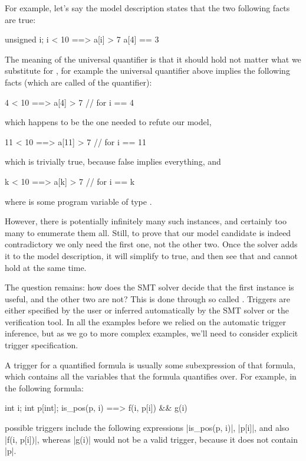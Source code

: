 For example, let's say the model description states that the two
following facts are true:
\begin{VCC}
\forall unsigned i; i < 10 ==> a[i] > 7
a[4] == 3
\end{VCC}
The meaning of the universal quantifier is that it should hold
not matter what we substitute for , for example
the universal quantifier above implies the following facts (which
are called  of the quantifier):
\begin{VCC}
 4 < 10 ==>  a[4] > 7  // for i == 4
\end{VCC}
which happens to be the one needed to refute our model,
\begin{VCC}
11 < 10 ==> a[11] > 7  // for i == 11
\end{VCC}
which is trivially true, because false implies everything, and
\begin{VCC}
 k < 10 ==>  a[k] > 7  // for i == k
\end{VCC}
where  is some program variable of type .

However, there is potentially infinitely many such instances, and certainly too many
to enumerate them all.
Still, to prove that our model candidate is indeed contradictory
we only need the first one, not the other two.
Once the solver adds it to the model description,
it will simplify  to true,
and then see that  and  cannot hold
at the same time.

The question remains: how does the SMT solver decide that the first
instance is useful, and the other two are not?
This is done through so called .
Triggers are either specified by the user or inferred automatically
by the SMT solver or the verification tool.
In all the examples before we relied on the automatic trigger
inference, but as we go to more complex examples, we'll need to consider
explicit trigger specification.

A trigger for a quantified formula is usually some subexpression 
of that formula, which contains all the variables that the formula
quantifies over.
For example, in the following formula:
\begin{VCC}
\forall int i; int p[int]; is_pos(p, i) ==> f(i, p[i]) && g(i)
\end{VCC}
possible triggers include the following expressions
\vcc|is_pos(p, i)|, \vcc|p[i]|, and also \vcc|f(i, p[i])|,
whereas \vcc|g(i)| would not be a valid trigger, because
it does not contain \vcc|p|.

